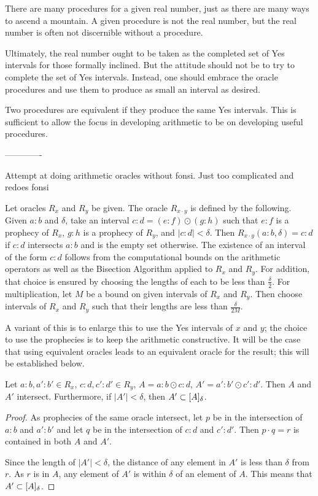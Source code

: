 There are many procedures for a given real number, just as there are many ways to ascend a mountain. A given procedure is not the real number, but the real number is often not discernible without a procedure. 

Ultimately, the real number ought to be taken as the completed set of Yes intervals for those formally inclined. But the attitude should not be to try to complete the set of Yes intervals. Instead, one should embrace the oracle procedures and use them to produce as small an interval as desired. 

Two procedures are equivalent if they produce the same Yes intervals. This is sufficient to allow the focus in developing arithmetic to be on developing useful procedures. 


-------------

Attempt at doing arithmetic oracles without fonsi.  Just too complicated and redoes fonsi


Let oracles $R_x$ and $R_y$ be given. The oracle $R_{x \cdot y}$ is defined by the following. Given $a:b$ and $\delta$, take an interval $c:d = (e:f) \odot (g:h)$ such that $e:f$ is a prophecy of $R_x$, $g:h$ is a prophecy of $R_y$, and $|c:d| < \delta$. Then $R_{x \cdot y}(a:b, \delta) = c:d$ if $c:d$ intersects $a:b$ and is the empty set otherwise. 
The existence of an interval of the form $c:d$ follows from the computational bounds on the arithmetic operators as well as the Bisection Algorithm applied to $R_x$ and $R_y$. For addition, that choice is ensured by choosing the lengths of each to be less than $\frac{\delta}{2}$. For multiplication, let $M$ be a bound on given intervals of $R_x$ and $R_y$. Then choose intervals of $R_x$ and $R_y$ such that their lengths are less than $\frac{\delta}{2M}$. 

 A variant of this is to enlarge this to use the Yes intervals of $x$ and $y$; the choice to use the prophecies is to keep the arithmetic constructive. It will be the case that using equivalent oracles leads to an equivalent oracle for the result; this will be established below. 

\begin{lemma}
    Let $a:b, a':b' \in R_{x}$, $c:d, c':d' \in R_y$, $A =  a:b \odot c:d$, $A' =  a':b' \odot c':d'$. Then $A$ and $A'$ intersect. Furthermore, if $|A'| < \delta$, then $A' \subset [A]_{\delta}$.
\end{lemma}

\begin{proof}   
    As prophecies of the same oracle intersect, let $p$ be in the intersection of $a:b$ and $a':b'$ and let $q$ be in the intersection of $c:d$ and $c':d'$. Then $p \cdot q = r$ is contained in both $A$ and $A'$. 
    
    Since the length of $|A'| < \delta$, the distance of any element in $A'$ is less than $\delta$ from $r$. As $r$ is in $A$, any element of $A'$ is within $\delta$ of an element of $A$. This means that $A' \subset [A]_{\delta}$.
\end{proof}



